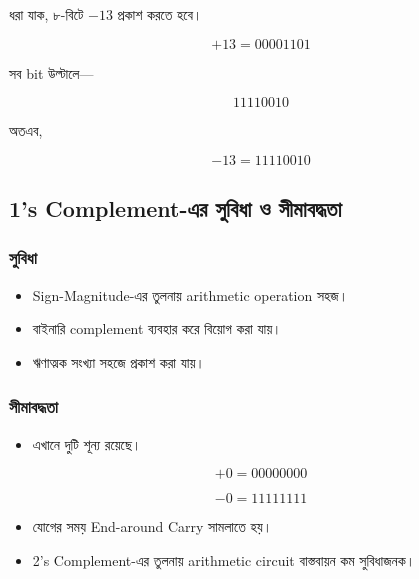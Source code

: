 ধরা যাক, ৮-বিটে $-13$ প্রকাশ করতে হবে।

\[
+13=00001101
\]

সব \textenglish{bit} উল্টালে—

\[
11110010
\]

অতএব,

\[
\boxed{-13=11110010}
\]


\subsection{\textenglish{1's Complement}-এর সুবিধা ও সীমাবদ্ধতা}

\subsubsection*{সুবিধা}

\begin{itemize}[label={{\bulletfont\textbullet}}, leftmargin=*, nosep]
    \item \textenglish{Sign-Magnitude}-এর তুলনায়
    \textenglish{arithmetic operation} সহজ।
    \item বাইনারি \textenglish{complement} ব্যবহার করে বিয়োগ করা যায়।
    \item ঋণাত্মক সংখ্যা সহজে প্রকাশ করা যায়।
\end{itemize}

\subsubsection*{সীমাবদ্ধতা}

\begin{itemize}[label={{\bulletfont\textbullet}}, leftmargin=*, nosep]
    \item এখানে দুটি শূন্য রয়েছে।
\end{itemize}

\[
+0=00000000
\]

\[
-0=11111111
\]

\begin{itemize}[label={{\bulletfont\textbullet}}, leftmargin=*, nosep]
    \item যোগের সময় \textenglish{End-around Carry} সামলাতে হয়।
    \item \textenglish{2's Complement}-এর তুলনায়
    \textenglish{arithmetic circuit} বাস্তবায়ন কম সুবিধাজনক।
\end{itemize}

